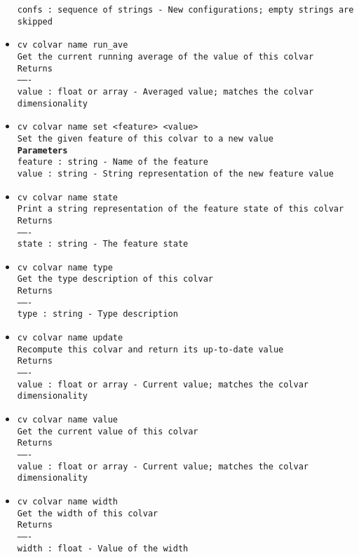 \begin{itemize}
\texttt{confs : sequence of strings - New configurations; empty strings are skipped}
\item \texttt{cv colvar name run\_ave}
\\
\texttt{Get the current running average of the value of this colvar}
\\
\texttt{Returns}
\\
\texttt{-------}
\\
\texttt{value : float or array - Averaged value; matches the colvar dimensionality}
\item \texttt{cv colvar name set <feature> <value>}
\\
\texttt{Set the given feature of this colvar to a new value}
\\
\texttt{\textbf{Parameters}}
\\
\texttt{feature : string - Name of the feature}
\\
\texttt{value : string - String representation of the new feature value}
\item \texttt{cv colvar name state}
\\
\texttt{Print a string representation of the feature state of this colvar}
\\
\texttt{Returns}
\\
\texttt{-------}
\\
\texttt{state : string - The feature state}
\item \texttt{cv colvar name type}
\\
\texttt{Get the type description of this colvar}
\\
\texttt{Returns}
\\
\texttt{-------}
\\
\texttt{type : string - Type description}
\item \texttt{cv colvar name update}
\\
\texttt{Recompute this colvar and return its up-to-date value}
\\
\texttt{Returns}
\\
\texttt{-------}
\\
\texttt{value : float or array - Current value; matches the colvar dimensionality}
\item \texttt{cv colvar name value}
\\
\texttt{Get the current value of this colvar}
\\
\texttt{Returns}
\\
\texttt{-------}
\\
\texttt{value : float or array - Current value; matches the colvar dimensionality}
\item \texttt{cv colvar name width}
\\
\texttt{Get the width of this colvar}
\\
\texttt{Returns}
\\
\texttt{-------}
\\
\texttt{width : float - Value of the width}
\end{itemize}
